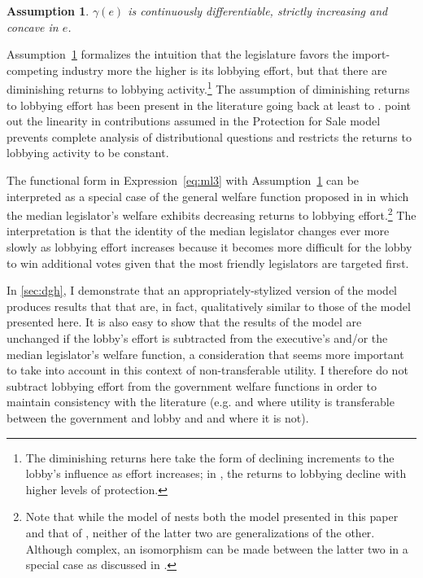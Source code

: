 \documentclass[authoryear, review]{elsarticle}
\newtheorem{assumption}{Assumption}
\newcommand{\ga}{\gamma}
\begin{document}
\begin{assumption}
  $\ga(e)$ is continuously differentiable, strictly increasing and concave in $e$.
  \label{as:ga_c3}
\end{assumption}

Assumption~\ref{as:ga_c3} formalizes the intuition that the legislature favors the import-competing industry more the higher is its lobbying effort, but that there are diminishing returns to lobbying activity.\footnote{The diminishing returns here take the form of declining increments to the lobby's influence as effort increases; in \citet{ethier2012}, the returns to lobbying decline with higher levels of protection.} The assumption of diminishing returns to lobbying effort has been present in the literature going back at least to \citet{fw}. \citet{dgh97} point out the linearity in contributions assumed in the Protection for Sale model prevents complete analysis of distributional questions and restricts the returns to lobbying activity to be constant.

The functional form in Expression~\ref{eq:ml3} with Assumption~\ref{as:ga_c3} can be interpreted as a special case of the general welfare function proposed in \citet{dgh97} in which the median legislator's welfare exhibits decreasing returns to lobbying effort.\footnote{Note that while the model of \citet{dgh97} nests both the model presented in this paper and that of \citet{gh94}, neither of the latter two are generalizations of the other. Although complex, an isomorphism can be made between the latter two in a special case as discussed in \citet{buzard2013b}.\label{fn:dghpfs}} The interpretation is that the identity of the median legislator changes ever more slowly as lobbying effort increases because it becomes more difficult for the lobby to win additional votes given that the most friendly legislators are targeted first.

In \ref{sec:dgh}, I demonstrate that an appropriately-stylized version of the \citet{dgh97} model produces results that that are, in fact, qualitatively similar to those of the model presented here. It is also easy to show that the results of the model are unchanged if the lobby's effort is subtracted from the executive's and/or the median legislator's welfare function, a consideration that seems more important to take into account in this context of non-transferable utility. I therefore do not subtract lobbying effort from the government welfare functions in order to maintain consistency with the literature (e.g. \citet{gh94} and \citet{mrc2007} where utility is transferable between the government and lobby and \citet{dgh97} and \citet{lt} where it is not).
\end{document}

